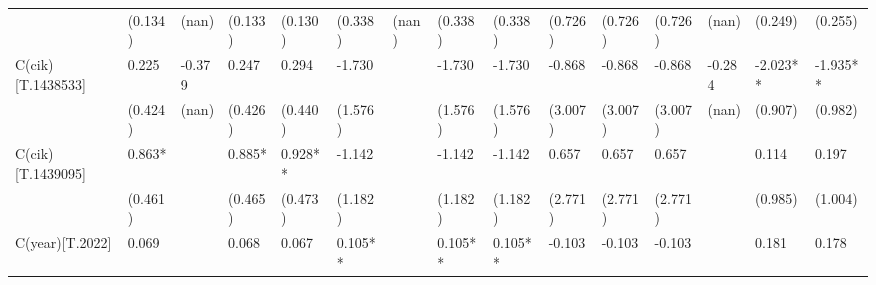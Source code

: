 \begin{table}
\begin{center}
\begin{tabular}{lllllllllllllll}
                  & (0.134)            & (nan)              & (0.133)                & (0.130)             & (0.338)              & (nan)                & (0.338)                  & (0.338)               & (0.726)              & (0.726)                  & (0.726)               & (nan)                         & (0.249)                                   & (0.255)                                 \\
C(cik)[T.1438533] & 0.225              & -0.379             & 0.247                  & 0.294               & -1.730               &                      & -1.730                   & -1.730                & -0.868               & -0.868                   & -0.868                & -0.284                        & -2.023**                                  & -1.935**                                \\
                  & (0.424)            & (nan)              & (0.426)                & (0.440)             & (1.576)              &                      & (1.576)                  & (1.576)               & (3.007)              & (3.007)                  & (3.007)               & (nan)                         & (0.907)                                   & (0.982)                                 \\
C(cik)[T.1439095] & 0.863*             &                    & 0.885*                 & 0.928**             & -1.142               &                      & -1.142                   & -1.142                & 0.657                & 0.657                    & 0.657                 &                               & 0.114                                     & 0.197                                   \\
                  & (0.461)            &                    & (0.465)                & (0.473)             & (1.182)              &                      & (1.182)                  & (1.182)               & (2.771)              & (2.771)                  & (2.771)               &                               & (0.985)                                   & (1.004)                                 \\
C(year)[T.2022]   & 0.069              &                    & 0.068                  & 0.067               & 0.105**              &                      & 0.105**                  & 0.105**               & -0.103               & -0.103                   & -0.103                &                               & 0.181                                     & 0.178                                   \\

\end{tabular}
\end{center}
\end{table}

